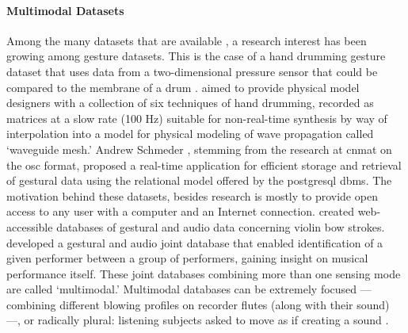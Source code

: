 	\paragraph{Multimodal Datasets}
	Among the many datasets that are available , a research interest has been growing among gesture datasets. This is the case of a hand drumming gesture dataset that uses data from a two-dimensional pressure sensor that could be compared to the membrane of a drum \parencite{DBLP:conf/icmc/JonesLS07}. \citeauthor{DBLP:conf/icmc/JonesLS07} aimed to provide physical model designers with a collection of six techniques of hand drumming, recorded as matrices at a slow rate (100 Hz) suitable for non-real-time synthesis by way of interpolation into a model for physical modeling of wave propagation called `waveguide mesh.' Andrew Schmeder \parencite{icmc/bbp2372.2009.005}, stemming from the research at \gls{cnmat} on the \gls{osc} format, proposed a real-time application for efficient storage and retrieval of gestural data using the relational model offered by the \gls{postgresql} \gls{dbms}. The motivation behind these datasets, besides research is mostly to provide open access to any user with a computer and an Internet connection. \textcite{Young2007} created web-accessible databases of gestural and audio data concerning violin bow strokes. \textcite{Hochenbaum2010} developed a gestural and audio joint database that enabled identification of a given performer between a group of performers, gaining insight on musical performance itself. These joint databases combining more than one sensing mode are called `multimodal.' Multimodal databases can be extremely focused ---combining different blowing profiles on recorder flutes (along with their sound) \parencite{Garcia2011}---, or radically plural: listening subjects asked to move as if creating a sound \parencite{fvisi:2017}. 

